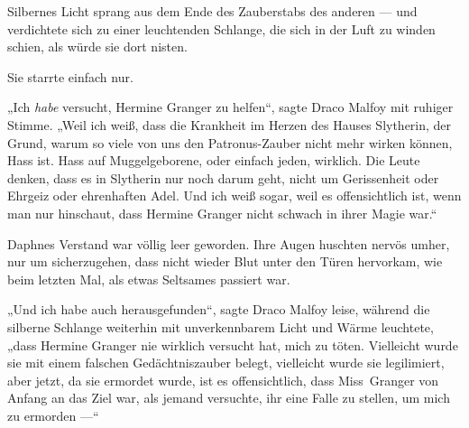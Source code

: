 
Silbernes Licht sprang aus dem Ende des Zauberstabs des anderen — und verdichtete sich zu einer leuchtenden Schlange, die sich in der Luft zu winden schien, als würde sie dort nisten.

Sie starrte einfach nur.

„Ich \emph{habe} versucht, Hermine Granger zu helfen“, sagte Draco Malfoy mit ruhiger Stimme.
„Weil ich weiß, dass die Krankheit im Herzen des Hauses Slytherin, der Grund, warum so viele von uns den Patronus-Zauber nicht mehr wirken können, Hass ist. Hass auf Muggelgeborene, oder einfach jeden, wirklich. Die Leute denken, dass es in Slytherin nur noch darum geht, nicht um Gerissenheit oder Ehrgeiz oder ehrenhaften Adel. Und ich weiß sogar, weil es offensichtlich ist, wenn man nur hinschaut, dass Hermine Granger nicht schwach in ihrer Magie war.“

Daphnes Verstand war völlig leer geworden. Ihre Augen huschten nervös umher, nur um sicherzugehen, dass nicht wieder Blut unter den Türen hervorkam, wie beim letzten Mal, als etwas Seltsames passiert war.

„Und ich habe auch herausgefunden“, sagte Draco Malfoy leise, während die silberne Schlange weiterhin mit unverkennbarem Licht und Wärme leuchtete, „dass Hermine Granger nie wirklich versucht hat, mich zu töten. Vielleicht wurde sie mit einem falschen Gedächtniszauber belegt, vielleicht wurde sie legilimiert, aber jetzt, da sie ermordet wurde, ist es offensichtlich, dass Miss~Granger von Anfang an das Ziel war, als jemand versuchte, ihr eine Falle zu stellen, um mich zu ermorden —“

